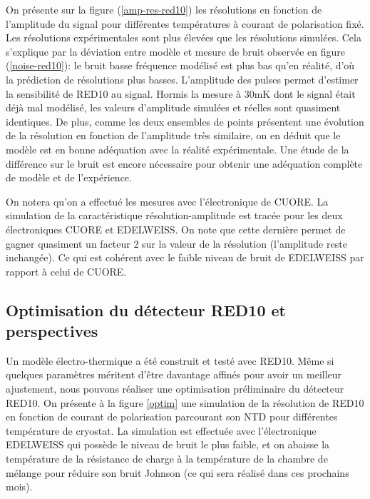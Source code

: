 On présente sur la figure (\ref{amp-res-red10}) les résolutions en fonction de l'amplitude du signal pour différentes températures à courant de polarisation fixé. Les résolutions expérimentales sont plus élevées que les résolutions simulées. Cela s'explique par la déviation entre modèle et mesure de bruit observée en figure (\ref{noise-red10}): le bruit basse fréquence modélisé est plus bas qu'en réalité, d'où la prédiction de résolutions plus basses. L'amplitude des pulses permet d'estimer la sensibilité de RED10 au signal. Hormis la mesure à $30$mK dont le signal était déjà mal modélisé, les valeurs d'amplitude simulées et réelles sont quasiment identiques. De plus, comme les deux ensembles de points présentent une évolution de la résolution en fonction de l'amplitude très similaire, on en déduit que le modèle est en bonne adéquation avec la réalité expérimentale. Une étude de la différence sur le bruit est encore nécessaire pour obtenir une adéquation complète de modèle et de l'expérience.

On notera qu'on a effectué les mesures avec l'électronique de CUORE. La simulation de la caractéristique résolution-amplitude est tracée pour les deux électroniques CUORE et EDELWEISS. On note que cette dernière permet de gagner quasiment un facteur 2 sur la valeur de la résolution (l'amplitude reste inchangée). Ce qui est cohérent avec le faible niveau de bruit de EDELWEISS par rapport à celui de CUORE.

\subsection{Optimisation du détecteur RED10 et perspectives}

Un modèle électro-thermique a été construit et testé avec RED10. Même si quelques paramètres méritent d'être davantage affinés pour avoir un meilleur ajustement, nous pouvons réaliser une optimisation préliminaire du détecteur RED10. On présente à la figure \ref{optim} une simulation de la résolution de RED10 en fonction de courant de polarisation parcourant son NTD pour différentes température de cryostat. La simulation est effectuée avec l'électronique EDELWEISS qui possède le niveau de bruit le plus faible, et on abaisse la température de la résistance de charge à la température de la chambre de mélange pour réduire son bruit Johnson (ce qui sera réalisé dans ces prochains mois).

